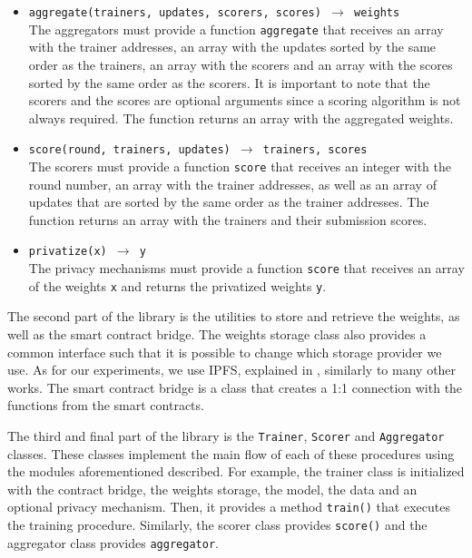 \begin{itemize}
    \item \texttt{aggregate(trainers, updates, scorers, scores) $\rightarrow$ weights}\\
    The aggregators must provide a function \texttt{aggregate} that receives an array with the trainer addresses, an array with the updates sorted by the same order as the trainers, an array with the scorers and an array with the scores sorted by the same order as the scorers. It is important to note that the scorers and the scores are optional arguments since a scoring algorithm is not always required. The function returns an array with the aggregated weights. %
    
    \item \texttt{score(round, trainers, updates) $\rightarrow$ trainers, scores}\\
    The scorers must provide a function \texttt{score} that receives an integer with the round number, an array with the trainer addresses, as well as an array of updates that are sorted by the same order as the trainer addresses. The function returns an array with the trainers and their submission scores. %
    
    \item \texttt{privatize(x) $\rightarrow$ y}\\
    The privacy mechanisms must provide a function \texttt{score} that receives an array of the weights \texttt{x} and returns the privatized weights \texttt{y}. %
\end{itemize}

The second part of the library is the utilities to store and retrieve the weights, as well as the smart contract bridge. The weights storage class also provides a common interface such that it is possible to change which storage provider we use. As for our experiments, we use IPFS, explained in , similarly to many other works. The smart contract bridge is a class that creates a 1:1 connection with the functions from the smart contracts.

The third and final part of the library is the \texttt{Trainer}, \texttt{Scorer} and \texttt{Aggregator} classes. These classes implement the main flow of each of these procedures using the modules aforementioned described. For example, the trainer class is initialized with the contract bridge, the weights storage, the model, the data and an optional privacy mechanism. Then, it provides a method \texttt{train()} that executes the training procedure. Similarly, the scorer class provides \texttt{score()} and the aggregator class provides \texttt{aggregator}.

